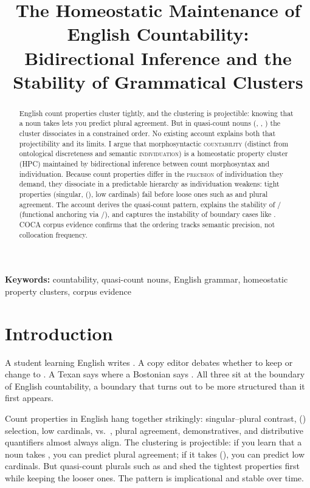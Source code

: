 \documentclass[12pt,a4paper]{article}
\title{The Homeostatic Maintenance of English Countability:\\Bidirectional Inference and the Stability of Grammatical Clusters}
\author{}
\date{}
\begin{document}
\maketitle

\noindent\textbf{Keywords:} countability, quasi-count nouns, English grammar, homeostatic property clusters, corpus evidence

\begin{abstract}
English count properties cluster tightly, and the clustering is projectible: knowing that a noun takes  lets you predict plural agreement. But in quasi-count nouns (, , ) the cluster dissociates in a constrained order. No existing account explains both that projectibility and its limits. I argue that morphosyntactic \textsc{countability} (distinct from ontological discreteness and semantic \textsc{individuation}) is a homeostatic property cluster (HPC) maintained by bidirectional inference between count morphosyntax and individuation. Because count properties differ in the \textsc{precision} of individuation they demand, they dissociate in a predictable hierarchy as individuation weakens: tight properties (singular, (), low cardinals) fail before loose ones such as  and plural agreement. The account derives the quasi-count pattern, explains the stability of / (functional anchoring via /), and captures the instability of boundary cases like . COCA corpus evidence confirms that the ordering tracks semantic precision, not collocation frequency.
\end{abstract}

\section{Introduction}

A student learning English writes . A copy editor debates whether to keep  or change to . A Texan says  where a Bostonian says . All three sit at the boundary of English countability, a boundary that turns out to be more structured than it first appears.

Count properties in English hang together strikingly: singular--plural contrast, () selection, low cardinals,  vs.\ , plural agreement, demonstratives, and distributive quantifiers almost always align. The clustering is projectible: if you learn that a noun takes , you can predict plural agreement; if it takes (), you can predict low cardinals. But quasi-count plurals such as  and  shed the tightest properties first while keeping the looser ones. The pattern is implicational and stable over time.
\end{document}
